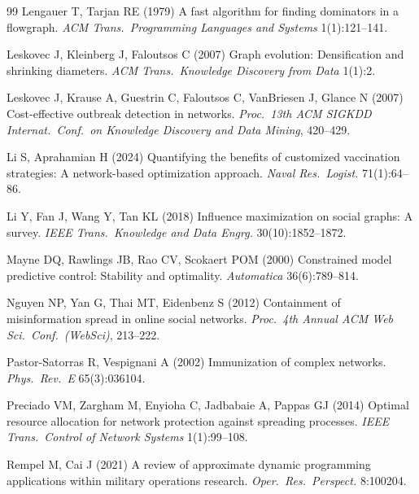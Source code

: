 \documentclass[11pt]{article}
\theoremstyle{definition}
\theoremstyle{remark}
\begin{document}
\begin{thebibliography}{99}
Lengauer T, Tarjan RE (1979) A fast algorithm for finding dominators in a
  flowgraph. \emph{ACM Trans.\ Programming Languages and Systems}
  1(1):121--141.

Leskovec J, Kleinberg J, Faloutsos C (2007) Graph evolution: Densification
  and shrinking diameters. \emph{ACM Trans.\ Knowledge Discovery from
  Data} 1(1):2.

Leskovec J, Krause A, Guestrin C, Faloutsos C, VanBriesen J, Glance N (2007)
  Cost-effective outbreak detection in networks. \emph{Proc.\ 13th ACM SIGKDD
  Internat.\ Conf.\ on Knowledge Discovery and Data Mining}, 420--429.

Li S, Aprahamian H (2024) Quantifying the benefits of customized vaccination
  strategies: A network-based optimization approach. \emph{Naval Res.\ Logist.}
  71(1):64--86.

Li Y, Fan J, Wang Y, Tan KL (2018) Influence maximization on social graphs: A
  survey. \emph{IEEE Trans.\ Knowledge and Data Engrg.} 30(10):1852--1872.

Mayne DQ, Rawlings JB, Rao CV, Scokaert POM (2000) Constrained model
  predictive control: Stability and optimality. \emph{Automatica}
  36(6):789--814.

Nguyen NP, Yan G, Thai MT, Eidenbenz S (2012) Containment of misinformation
  spread in online social networks. \emph{Proc.\ 4th Annual ACM Web Sci.\
  Conf.\ (WebSci)}, 213--222.

Pastor-Satorras R, Vespignani A (2002) Immunization of complex networks.
  \emph{Phys.\ Rev.\ E} 65(3):036104.

Preciado VM, Zargham M, Enyioha C, Jadbabaie A, Pappas GJ (2014) Optimal
  resource allocation for network protection against spreading processes.
  \emph{IEEE Trans.\ Control of Network Systems} 1(1):99--108.

Rempel M, Cai J (2021) A review of approximate dynamic programming
  applications within military operations research. \emph{Oper.\ Res.\ Perspect.}
  8:100204.


\end{thebibliography}
\end{document}
